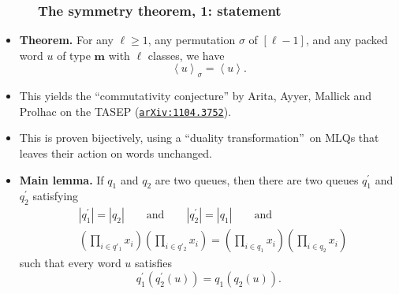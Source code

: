 \documentclass{beamer}
\newcommand{\red}{\color{red}}
\newcommand\arxiv[1]{\href{http://www.arxiv.org/abs/#1}{\texttt{arXiv:#1}}}
\newcommand{\fti}[1]{\frametitle{\ \ \ \ \ #1}}
\newcommand{\tup}[1]{\left( #1 \right)}
\theoremstyle{plain}
\newcommand{\0}{\phantom{c}}
\let\prodnonlimits\prod
\renewcommand{\prod}{\prodnonlimits\limits}
\begin{document}
\begin{frame}
\fti{The symmetry theorem, 1: statement}

\begin{itemize}
\item \textbf{Theorem.} For any $\ell\geq1$, any permutation $\sigma$ of
$\left[  \ell-1\right]  $, and any packed word $u$ of type $\mathbf{m}$ with
$\ell$ classes, we have
\[
\left\langle u\right\rangle _{\sigma}=\left\langle u\right\rangle .
\]

\pause
\item This yields the ``commutativity conjecture'' by Arita, Ayyer, Mallick
and Prolhac on the TASEP ({\red \arxiv{1104.3752}}).

\pause
\item This is proven bijectively, using a \textquotedblleft duality
transformation\textquotedblright\ on MLQs that leaves their action on words unchanged.

\item \textbf{Main lemma.} If $q_{1}$ and $q_{2}$ are two queues, then there
are two queues $q_{1}^{\prime}$ and $q_{2}^{\prime}$ satisfying
\begin{align*}
&\left\vert q_{1}^{\prime}\right\vert =\left\vert q_{2}\right\vert
\qquad\text{and}\qquad\left\vert q_{2}^{\prime}\right\vert =\left\vert
q_{1}\right\vert \qquad \text{and} \\
& \tup{\prod_{i \in q'_1} x_i} \tup{\prod_{i \in q'_2} x_i}
  = \tup{\prod_{i \in q_1} x_i} \tup{\prod_{i \in q_2} x_i}
\end{align*}
such that every word $u$ satisfies%
\[
q_{1}^{\prime}\left(  q_{2}^{\prime}\left(  u\right)  \right)  =q_{1}\left(
q_{2}\left(  u\right)  \right)  .
\]

\end{itemize}
\vspace{10cm}
\end{frame}
\end{document}
